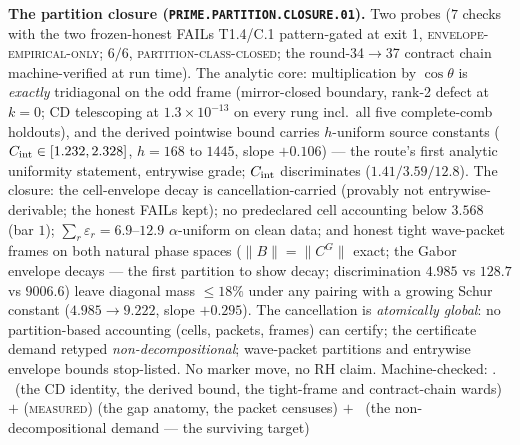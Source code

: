 \par\smallskip\noindent\textbf{The partition closure
(\texttt{PRIME.PARTITION.\allowbreak CLOSURE.01}).}
Two probes ($7$ checks with the two frozen-honest FAILs
T1.4/C.1 pattern-gated at exit 1,
\textsc{envelope-empirical-only}; $6/6$,
\textsc{partition-class-closed}; the round-34$\to$37 contract
chain machine-verified at run time).  The analytic core:
multiplication by $\cos\theta$ is \emph{exactly} tridiagonal on
the odd frame (mirror-closed boundary, rank-2 defect at $k = 0$;
CD telescoping at $1.3\times10^{-13}$ on every rung incl.\ all
five complete-comb holdouts), and the derived pointwise bound
carries $h$-uniform source constants ($C_{\rm int} \in [1.232,
2.328]$, $h = 168$ to $1445$, slope $+0.106$) --- the route's
first analytic uniformity statement, entrywise grade; $C_{\rm
int}$ discriminates ($1.41/3.59/12.8$).  The closure: the
cell-envelope decay is cancellation-carried (provably not
entrywise-derivable; the honest FAILs kept); no predeclared cell
accounting below $3.568$ (bar $1$); $\sum_r \varepsilon_r =
6.9$--$12.9$ $\alpha$-uniform on clean data; and honest tight
wave-packet frames on both natural phase spaces ($\|B\| =
\|C^G\|$ exact; the Gabor envelope decays --- the first
partition to show decay; discrimination $4.985$ vs $128.7$ vs
$9006.6$) leave diagonal mass $\le 18\%$ under any pairing with
a growing Schur constant ($4.985 \to 9.222$, slope $+0.295$).
The cancellation is \emph{atomically global}: no partition-based
accounting (cells, packets, frames) can certify; the certificate
demand retyped \emph{non-decompositional}; wave-packet
partitions and entrywise envelope bounds stop-listed.  No marker
move, no RH claim.
Machine-checked: .
\mE\ (the CD identity, the derived bound, the tight-frame and
contract-chain wards) $+$ (\textsc{measured}) (the gap anatomy,
the packet censuses) $+$ \mO\ (the non-decompositional demand
--- the surviving target)
\par\smallskip


